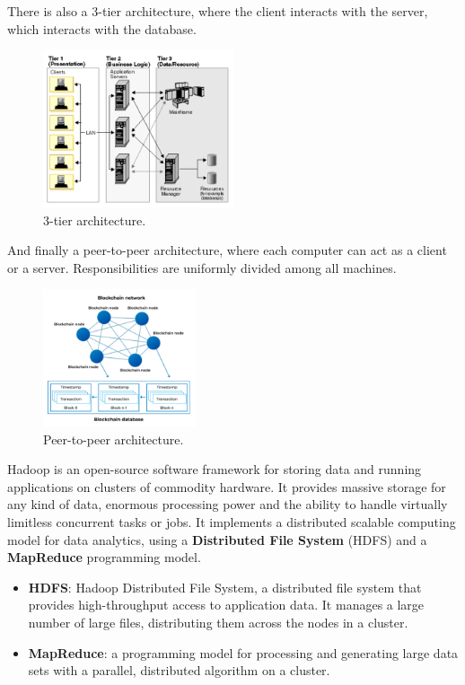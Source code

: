 There is also a 3-tier architecture, where the client interacts with the server, which interacts with the database.

\begin{figure}[H]
    \centering
    \includegraphics[width=0.5\textwidth]{assets/fig3.png}
    \caption{3-tier architecture.}
    \label{fig:3}
\end{figure}

And finally a peer-to-peer architecture, where each computer can act as a client or a server. Responsibilities are uniformly divided among all machines. 

\begin{figure}[H]
    \centering
    \includegraphics[width=0.4\textwidth]{assets/fig4.png}
    \caption{Peer-to-peer architecture.}
    \label{fig:4}
\end{figure}

\begin{exampleblock}[Hadoop]
    Hadoop is an open-source software framework for storing data and running applications on clusters of commodity hardware. It provides massive storage for any kind of data, enormous processing power and the ability to handle virtually limitless concurrent tasks or jobs.
    It implements a distributed scalable computing model for data analytics, using a \textbf{Distributed File System} (HDFS) and a \textbf{MapReduce} programming model.

    \begin{itemize}
        \item \textbf{HDFS}: Hadoop Distributed File System, a distributed file system that provides high-throughput access to application data. It manages a large number of large files, distributing them across the nodes in a cluster.
        \item \textbf{MapReduce}: a programming model for processing and generating large data sets with a parallel, distributed algorithm on a cluster.
    \end{itemize}
\end{exampleblock}

